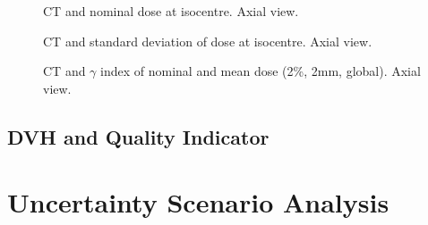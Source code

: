 \documentclass[a4paper]{scrartcl}
\begin{document}
\begin{figure}[!b]
  \centering
  
  \caption{CT and nominal dose at isocentre. Axial view.}
\end{figure}

\begin{figure}[!b]
  \centering
  
  \caption{CT and standard deviation of dose at isocentre. Axial view.}
\end{figure}

\begin{figure}[!b]
  \centering
  
  \caption{CT and $\gamma$ index of nominal and mean dose (2\%, 2mm, global). Axial view.}
\end{figure}


\FloatBarrier

\newpage
\subsection{DVH and Quality Indicator}
\begin{center}

\end{center}


\FloatBarrier
\newpage
\section{Uncertainty Scenario Analysis}
\label{sec:usa}


\end{document}
